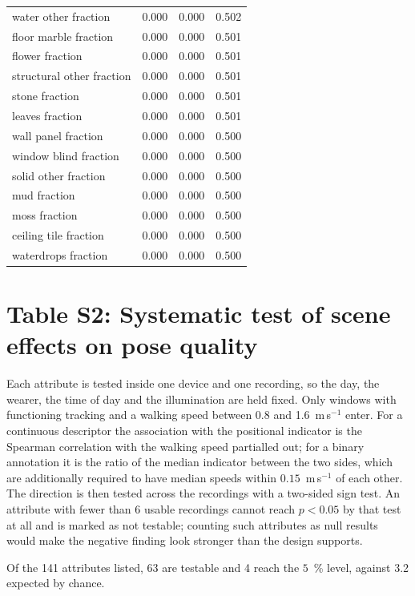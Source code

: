 \documentclass[11pt,a4paper]{article}
\begin{document}
\begin{longtable}{lrrr}
water other fraction & 0.000 & 0.000 & 0.502 \\
floor marble fraction & 0.000 & 0.000 & 0.501 \\
flower fraction & 0.000 & 0.000 & 0.501 \\
structural other fraction & 0.000 & 0.000 & 0.501 \\
stone fraction & 0.000 & 0.000 & 0.501 \\
leaves fraction & 0.000 & 0.000 & 0.501 \\
wall panel fraction & 0.000 & 0.000 & 0.500 \\
window blind fraction & 0.000 & 0.000 & 0.500 \\
solid other fraction & 0.000 & 0.000 & 0.500 \\
mud fraction & 0.000 & 0.000 & 0.500 \\
moss fraction & 0.000 & 0.000 & 0.500 \\
ceiling tile fraction & 0.000 & 0.000 & 0.500 \\
waterdrops fraction & 0.000 & 0.000 & 0.500 \\
\end{longtable}

\section*{Table S2: Systematic test of scene effects on pose quality}

Each attribute is tested inside one device and one recording, so the day, the wearer, the time of day and the illumination are held fixed. Only windows with functioning tracking and a walking speed between 0.8 and 1.6~m\,s$^{-1}$ enter. For a continuous descriptor the association with the positional indicator is the Spearman correlation with the walking speed partialled out; for a binary annotation it is the ratio of the median indicator between the two sides, which are additionally required to have median speeds within $0.15$~m\,s$^{-1}$ of each other. The direction is then tested across the recordings with a two-sided sign test. An attribute with fewer than 6 usable recordings cannot reach $p < 0.05$ by that test at all and is marked as not testable; counting such attributes as null results would make the negative finding look stronger than the design supports.

Of the 141 attributes listed, 63 are testable and 4 reach the $5$~\% level, against 3.2 expected by chance.
\end{document}
